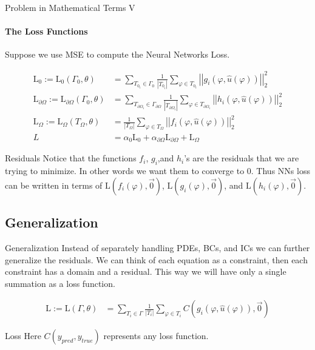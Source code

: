 \documentclass{beamer}
\begin{document}
\begin{frame}{Problem in Mathematical Terms V}
\framesubtitle{The Loss Functions}

Suppose we use MSE to compute the Neural Networks Loss. 

\begin{align}
    \mathrm{L}_0 := \mathrm{L}_0(\Gamma_0, \theta) &= \sum \limits_{T_{0_i} \in \Gamma_0} \frac{1}{\left|T_{0_i}\right|} \sum \limits_{\varphi \in T_{0_i}} {\left|\left| g_i(\varphi, \hat{u}(\varphi)) \right|\right|}_2^2 \\
    \mathrm{L}_{\partial\Omega} := \mathrm{L}_{\partial\Omega}(\Gamma_0, \theta) &= \sum \limits_{T_{{\partial\Omega}_i} \in \Gamma_{\partial\Omega}} \frac{1}{\left|T_{{\partial\Omega}_i}\right|} \sum \limits_{\varphi \in T_{{\partial\Omega}_i}} {\left|\left| h_i(\varphi, \hat{u}(\varphi)) \right|\right|}_2^2 \\
    \mathrm{L}_\Omega := \mathrm{L}_\Omega(T_\Omega, \theta) &=  \frac{1}{\left|T_{\Omega}\right|} \sum \limits_{\varphi \in T_{\Omega}} {\left|\left| f_i(\varphi, \hat{u}(\varphi)) \right|\right|}_2^2 \\
    L &= \alpha_0\mathrm{L}_0 + \alpha_{\partial\Omega}\mathrm{L}_{\partial\Omega} + \mathrm{L}_\Omega
\end{align}

\begin{block}{Residuals}
\small
Notice that the functions $f_i$, $g_i$,and $h_i$'s are the residuals that we are trying to minimize. In other words we want them to converge to $0$. Thus NNs loss can be written in terms of $\mathrm{L}(f_i(\varphi), \vec{0})$, $\mathrm{L}(g_i(\varphi), \vec{0})$, and $\mathrm{L}(h_i(\varphi), \vec{0})$.
\end{block}

\end{frame}

\subsection{Generalization}

\begin{frame}{Generalization}
Instead of separately handling PDEs, BCs, and ICs we can further generalize the residuals. We can think of each equation as a constraint, then each constraint has a domain and a residual. This way we will have only a single summation as a loss function.

\begin{align}
    \mathrm{L} := \mathrm{L}(\Gamma, \theta) &= \sum \limits_{T_i \in \Gamma} \frac{1}{\left|T_i\right|} \sum \limits_{\varphi \in T_i} C(g_i(\varphi, \hat{u}(\varphi)), \vec{0})
\end{align}

\begin{block}{Loss}
Here $C(y_{pred},y_{true})$ represents any loss function.
\end{block}

\end{frame}
\end{document}
